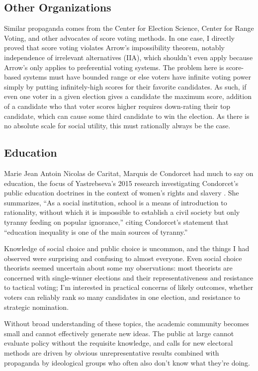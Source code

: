 \subsection{Other Organizations}
Similar propaganda comes from the Center for Election Science, Center for Range Voting, and other advocates of score voting methods.  In one case, I directly proved that score voting violates Arrow's impossibility theorem, notably independence of irrelevant alternatives (IIA), which shouldn't even apply because Arrow's only applies to preferential voting systems.  The problem here is score-based systems must have bounded range or else voters have infinite voting power simply by putting infinitely-high scores for their favorite candidates.  As such, if even one voter in a given election gives a candidate the maximum score, addition of a candidate who that voter scores higher requires down-rating their top candidate, which can cause some third candidate to win the election.  As there is no absolute scale for social utility, this must rationally always be the case.

\subsection{Education}

Marie Jean Antoin Nicolas de Caritat, Marquis de Condorcet had much to say on education, the focus of Yastrebseva's 2015 research investigating Condorcet's public education doctrines in the context of women's rights and slavery \autocite{Yastrebtseva2015}.  She summarizes, ``As a social institution, school is a means of introduction to rationality, without which it is impossible to establish a civil society but only tyranny feeding on popular ignorance,'' citing Condorcet's statement that ``education inequality is one of the main sources of tyranny.''

Knowledge of social choice and public choice is uncommon, and the things I had observed were surprising and confusing to almost everyone.  Even social choice theorists seemed uncertain about some my observations:  most theorists are concerned with single-winner elections and their representativeness and resistance to tactical voting; I'm interested in practical concerns of likely outcomes, whether voters can reliably rank so many candidates in one election, and resistance to strategic nomination.

Without broad understanding of these topics, the academic community becomes small and cannot effectively generate new ideas.  The public at large cannot evaluate policy without the requisite knowledge, and calls for new electoral methods are driven by obvious unrepresentative results combined with propaganda by ideological groups who often also don't know what they're doing.


